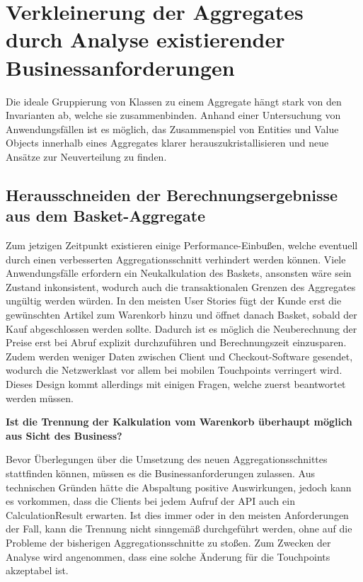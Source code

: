 

\section{Verkleinerung der Aggregates durch Analyse existierender Businessanforderungen}

Die ideale Gruppierung von Klassen zu einem Aggregate hängt stark von den Invarianten ab, welche sie zusammenbinden. Anhand einer Untersuchung von Anwendungsfällen ist es möglich, das Zusammenspiel von Entities und Value Objects innerhalb eines Aggregates klarer herauszukristallisieren und neue Ansätze zur Neuverteilung zu finden.

\subsection{Herausschneiden der Berechnungsergebnisse aus dem Basket-Aggregate}

Zum jetzigen Zeitpunkt existieren einige Performance-Einbußen, welche eventuell durch einen verbesserten Aggregationsschnitt verhindert werden können. Viele Anwendungsfälle erfordern ein Neukalkulation des Baskets, ansonsten wäre sein Zustand inkonsistent, wodurch auch die transaktionalen Grenzen des Aggregates ungültig werden würden. In den meisten User Stories fügt der Kunde erst die gewünschten Artikel zum Warenkorb hinzu und öffnet danach Basket, sobald der Kauf abgeschlossen werden sollte. Dadurch ist es möglich die Neuberechnung der Preise erst bei Abruf explizit durchzuführen und Berechnungszeit einzusparen. Zudem werden weniger Daten zwischen Client und Checkout-Software gesendet, wodurch die Netzwerklast vor allem bei mobilen Touchpoints verringert wird. Dieses Design kommt allerdings mit einigen Fragen, welche zuerst beantwortet werden müssen.

\textbf{Ist die Trennung der Kalkulation vom Warenkorb überhaupt möglich aus Sicht des Business?}

Bevor Überlegungen über die Umsetzung des neuen Aggregationsschnittes stattfinden können, müssen es die Businessanforderungen zulassen. Aus technischen Gründen hätte die Abspaltung positive Auswirkungen, jedoch kann es vorkommen, dass die Clients bei jedem Aufruf der API auch ein CalculationResult erwarten. Ist dies immer oder in den meisten Anforderungen der Fall, kann die Trennung nicht sinngemäß durchgeführt werden, ohne auf die Probleme der bisherigen Aggregationsschnitte zu stoßen. Zum Zwecken der Analyse wird angenommen, dass eine solche Änderung für die Touchpoints akzeptabel ist.

